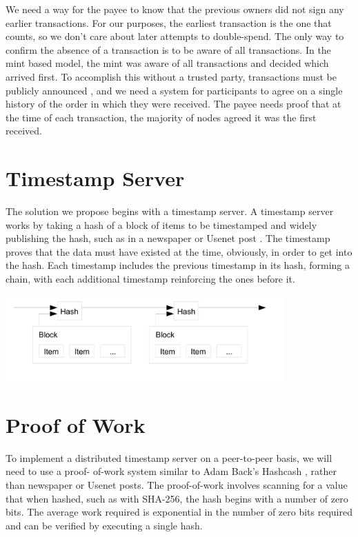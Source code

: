 \documentclass[10pt]{book}
\begin{document}
We need a way for the payee to know that the previous owners did not sign any earlier transactions.
For our purposes, the earliest transaction is the one that counts, so we don't care about later attempts to double-spend.
The only way to confirm the absence of a transaction is to be aware of all transactions.
In the mint based model, the mint was aware of all transactions and decided which arrived first.
To accomplish this without a trusted party, transactions must be publicly announced \cite{Dai}, and we need a system for participants to agree on a single history of the order in which they were received.
The payee needs proof that at the time of each transaction, the majority of nodes agreed it was the first received.

\chapter{Timestamp Server}
The solution we propose begins with a timestamp server.
A timestamp server works by taking a hash of a block of items to be timestamped and widely publishing the hash, such as in a newspaper or Usenet post \cite{Massias,Haber1,Haber2,Haber3}.
The timestamp proves that the data must have existed at the time, obviously, in order to get into the hash.
Each timestamp includes the previous timestamp in its hash, forming a chain, with each additional timestamp reinforcing the ones before it.

\begin{center}
\includegraphics[width=0.8\textwidth]{./images/2.png}
\end{center}
\chapter{Proof of Work}
To implement a distributed timestamp server on a peer-to-peer basis, we will need to use a proof- of-work system similar to Adam Back's Hashcash \cite{Back}, rather than newspaper or Usenet posts.
The proof-of-work involves scanning for a value that when hashed, such as with SHA-256, the hash begins with a number of zero bits.
The average work required is exponential in the number of zero bits required and can be verified by executing a single hash.
\end{document}
